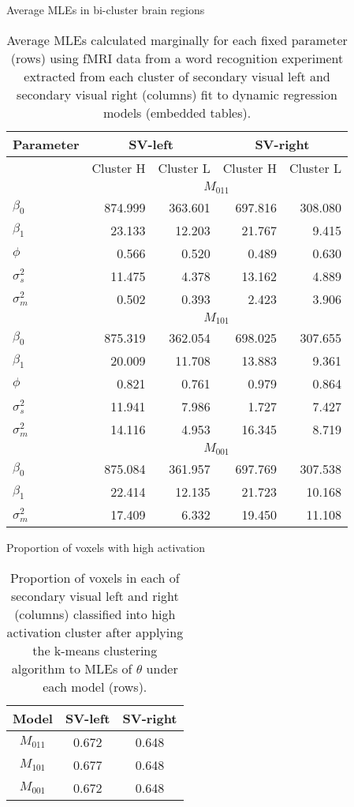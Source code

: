 \begin{table}
\ssp
\centering
\caption{Average MLEs in bi-cluster brain regions} \label{tab:fmri:mle:clusters}
\begin{tabular}{|l|rr|rr|}
\hline
Parameter & \multicolumn{2}{|c|}{SV-left} & \multicolumn{2}{|c|}{SV-right} \\
\hline
 & Cluster H & Cluster L & Cluster H & Cluster L \\
\hline
 & \multicolumn{4}{|c|}{$M_{011}$} \\
\hline
$\beta_0$ & 874.999 & 363.601 & 697.816 & 308.080 \\
$\beta_1$ & 23.133 & 12.203 & 21.767 & 9.415 \\
$\phi$ & 0.566 & 0.520 & 0.489 & 0.630 \\
$\sigma^2_s$ & 11.475 & 4.378 & 13.162 & 4.889 \\
$\sigma^2_m$ & 0.502 & 0.393 & 2.423 & 3.906 \\
\hline
 & \multicolumn{4}{|c|}{$M_{101}$} \\
\hline
$\beta_0$ & 875.319 & 362.054 & 698.025 & 307.655 \\
$\beta_1$ & 20.009 & 11.708 & 13.883 & 9.361 \\
$\phi$ & 0.821 & 0.761 & 0.979 & 0.864 \\
$\sigma^2_s$ & 11.941 & 7.986 & 1.727 & 7.427 \\
$\sigma^2_m$ & 14.116 & 4.953 & 16.345 & 8.719 \\
\hline
 & \multicolumn{4}{|c|}{$M_{001}$} \\
\hline
$\beta_0$ & 875.084 & 361.957 & 697.769 & 307.538 \\
$\beta_1$ & 22.414 & 12.135 & 21.723 & 10.168 \\
$\sigma^2_m$ & 17.409 & 6.332 & 19.450 & 11.108 \\
\hline
\end{tabular}
\caption*{Average MLEs calculated marginally for each fixed parameter (rows) using fMRI data from a word recognition experiment extracted from each cluster of secondary visual left and secondary visual right (columns) fit to dynamic regression models (embedded tables).}
\end{table}

\begin{table}
\ssp
\centering
\caption{Proportion of voxels with high activation} \label{tab:fmri:prop}
\begin{tabular}{|c|cc|}
\hline
Model & SV-left & SV-right \\
\hline
$M_{011}$ & 0.672 & 0.648 \\
$M_{101}$ & 0.677 & 0.648 \\
$M_{001}$ & 0.672 & 0.648 \\
\hline
\end{tabular}
\caption*{Proportion of voxels in each of secondary visual left and right (columns) classified into high activation cluster after applying the k-means clustering algorithm to MLEs of $\theta$ under each model (rows).}
\end{table}

